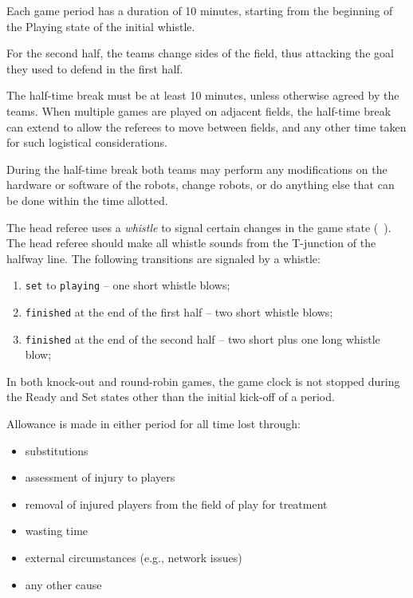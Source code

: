 Each game period has a duration of 10 minutes, starting from the beginning of the Playing state of the initial whistle.

For the second half, the teams change sides of the field, thus attacking the goal they used to defend in the first half.

\label{sec:half-time}

The half-time break must be at least 10 minutes, unless otherwise agreed by the teams. When multiple games are played on adjacent fields, the half-time break can extend to allow the referees to move between fields, and any other time taken for such logistical considerations.

During the half-time break both teams may perform any modifications on the hardware or software of the robots, change robots, or do anything else that can be done within the time allotted.

\label{sec:signals}

The head referee uses a \emph{whistle} to signal certain changes in the game state (\cf~).
The head referee should make all whistle sounds from the T-junction of the halfway line.
The following transitions are signaled by a whistle:
\begin{enumerate}
\item \texttt{set} to \texttt{playing} -- one short whistle blows;
\item \texttt{finished} at the end of the first half -- two short whistle blows;
\item \texttt{finished} at the end of the second half -- two short plus one long whistle blow;
\end{enumerate}


\label{sec:ready_set_clock}

In both knock-out and round-robin games, the game clock is not stopped during the Ready and Set states other than the initial kick-off of a period.

\label{sec:allowance_time_lost}

Allowance is made in either period for all time lost through:

\begin{itemize}
\item substitutions
\item assessment of injury to players
\item removal of injured players from the field of play for treatment
\item wasting time
\item external circumstances (e.g., network issues)
\item any other cause
\end{itemize}

